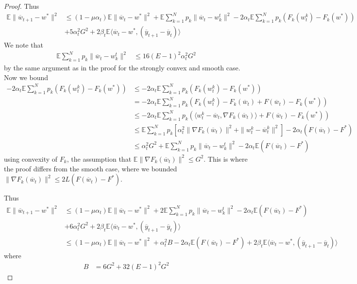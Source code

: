 \begin{proof}
	Thus 
	\begin{align*}
	\mathbb{E}\|\overline{w}_{t+1}-w^{\ast}\|^{2} & \leq(1-\mu\alpha_{t})\mathbb{E}\|\overline{w}_{t}-w^{\ast}\|^{2}+\mathbb{E}\sum_{k=1}^{N}p_{k}\|\overline{w}_{t}-w_{k}^{t}\|^{2}-2\alpha_{t}\mathbb{E}\sum_{k=1}^{N}p_{k}(F_{k}(w_{t}^{k})-F_{k}(w^{\ast}))\\
	& +5\alpha_{t}^{2}G^{2}+2\beta_{t}\mathbb{E}\langle\overline{w}_{t}-w^{\ast},(\overline{y}_{t+1}-\overline{y}_{t})\rangle
	\end{align*}
	We note that 
	\begin{align*}
	\mathbb{E}\sum_{k=1}^{N}p_{k}\|\overline{w}_{t}-w_{k}^{t}\|^{2} & \leq16(E-1)^{2}\alpha_{t}^{2}G^{2}
	\end{align*}
	by the same argument as in the proof for the strongly convex and
	smooth case. Now we bound 
	\begin{align*}
	-2\alpha_{t}\mathbb{E}\sum_{k=1}^{N}p_{k}(F_{k}(w_{t}^{k})-F_{k}(w^{\ast})) & \leq-2\alpha_{t}\mathbb{E}\sum_{k=1}^{N}p_{k}(F_{k}(w_{t}^{k})-F_{k}(w^{\ast}))\\
	& =-2\alpha_{t}\mathbb{E}\sum_{k=1}^{N}p_{k}(F_{k}(w_{t}^{k})-F_{k}(\overline{w}_{t})+F(\overline{w}_{t})-F_{k}(w^{\ast}))\\
	& \leq-2\alpha_{t}\mathbb{E}\sum_{k=1}^{N}p_{k}(\langle w_{t}^{k}-\overline{w}_{t},\nabla F_{k}(\overline{w}_{t})\rangle+F(\overline{w}_{t})-F_{k}(w^{\ast}))\\
	& \leq\mathbb{E}\sum_{k=1}^{N}p_{k}\left[\alpha_{t}^{2}\|\nabla F_{k}(\overline{w}_{t})\|^{2}+\|w_{t}^{k}-\overline{w}_{t}^{k}\|^{2}\right]-2\alpha_{t}(F(\overline{w}_{t})-F^{\ast})\\
	& \leq\alpha_{t}^{2}G^{2}+\mathbb{E}\sum_{k=1}^{N}p_{k}\|\overline{w}_{t}-w_{k}^{t}\|^{2}-2\alpha_{t}\mathbb{E}(F(\overline{w}_{t})-F^{\ast})
	\end{align*}
	using convexity of $F_{k}$, the assumption that $\mathbb{E}\|\nabla F_{k}(\overline{w}_{t})\|^{2}\leq G^{2}$.
	This is where the proof differs from the smooth case, where we bounded
	$\|\nabla F_{k}(\overline{w}_{t})\|^{2}\leq2L(F(\overline{w}_{t})-F^{\ast})$. 
	
	Thus 
	\begin{align*}
	\mathbb{E}\|\overline{w}_{t+1}-w^{\ast}\|^{2} & \leq(1-\mu\alpha_{t})\mathbb{E}\|\overline{w}_{t}-w^{\ast}\|^{2}+2\mathbb{E}\sum_{k=1}^{N}p_{k}\|\overline{w}_{t}-w_{k}^{t}\|^{2}-2\alpha_{t}\mathbb{E}(F(\overline{w}_{t})-F^{\ast})\\
	& +6\alpha_{t}^{2}G^{2}+2\beta_{t}\mathbb{E}\langle\overline{w}_{t}-w^{\ast},(\overline{y}_{t+1}-\overline{y}_{t})\rangle\\
	& \leq(1-\mu\alpha_{t})\mathbb{E}\|\overline{w}_{t}-w^{\ast}\|^{2}+\alpha_{t}^{2}B-2\alpha_{t}\mathbb{E}(F(\overline{w}_{t})-F^{\ast})+2\beta_{t}\mathbb{E}\langle\overline{w}_{t}-w^{\ast},(\overline{y}_{t+1}-\overline{y}_{t})\rangle
	\end{align*}
	where 
	\begin{align*}
	B & =6G^{2}+32(E-1)^{2}G^{2}
	\end{align*}
	

\end{proof}
